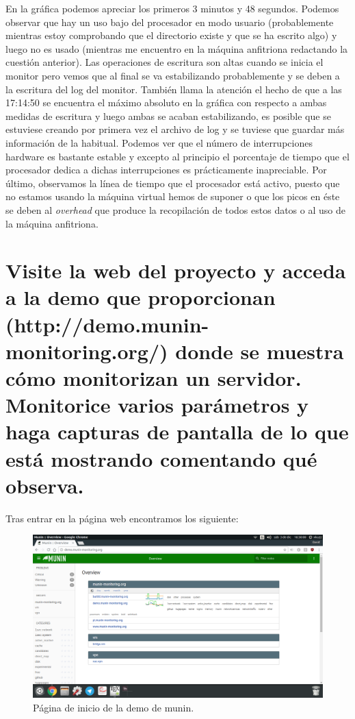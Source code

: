En la gráfica podemos apreciar los primeros 3 minutos y 48 segundos. Podemos observar que hay un uso bajo del procesador en modo usuario (probablemente mientras estoy comprobando que el directorio existe y que se ha escrito algo) y luego no es usado (mientras me encuentro en la máquina anfitriona redactando la cuestión anterior). Las operaciones de escritura son altas cuando se inicia el monitor pero vemos que al final se va estabilizando probablemente y se deben a la escritura del log del monitor. También llama la atención el hecho de que a las 17:14:50 se encuentra el máximo absoluto en la gráfica con respecto a ambas medidas de escritura y luego ambas se acaban estabilizando, es posible que se estuviese creando por primera vez el archivo de log y se tuviese que guardar más información de la habitual. Podemos ver que el número de interrupciones hardware es bastante estable y excepto al principio el porcentaje de tiempo que el procesador dedica a dichas interrupciones es prácticamente inapreciable. Por último, observamos la línea de tiempo que el procesador está activo, puesto que no estamos usando la máquina virtual hemos de suponer o que los picos en éste se deben al \textit{overhead} que produce la recopilación de todos estos datos o al uso de la máquina anfitriona.



\section{Visite la web del proyecto y acceda a la demo que proporcionan (http://demo.munin-monitoring.org/) donde se muestra cómo monitorizan un servidor. Monitorice varios parámetros y haga capturas de pantalla de lo que está mostrando comentando qué observa.}

Tras entrar en la página web encontramos los siguiente:
\begin{figure}[H]
	\centering
	\includegraphics[scale=0.3]{munin1.png}
	\caption{Página de inicio de la demo de munin.}
\end{figure}

